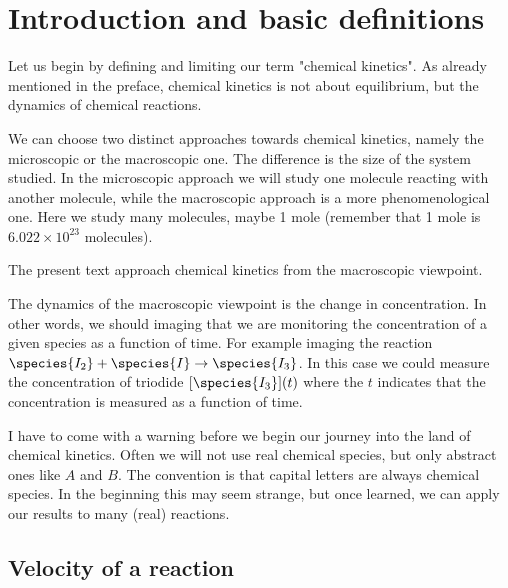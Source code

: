 
\chapter{Introduction and basic definitions}
\label{chap:intro}

Let us begin by defining and limiting our term "chemical kinetics". As already mentioned in the preface, chemical kinetics is not about equilibrium, but the dynamics of chemical reactions.

We can choose two distinct approaches towards chemical kinetics, namely the microscopic or the macroscopic one. The difference is the size of the system studied. In the microscopic approach we will study one molecule reacting with another molecule, while the macroscopic approach is a more phenomenological one. Here we study many molecules, maybe 1 mole (remember that 1 mole is $6.022\times 10^{23}$ molecules).

The present text approach chemical kinetics from the macroscopic viewpoint.

The dynamics of the macroscopic viewpoint is the change in concentration. In other words, we should imaging that we are monitoring the concentration of a given species as a function of time. For example imaging the reaction $\species{I_2} + \species{I} \rightarrow \species{I_3}$. In this case we could measure the concentration of triodide \ie $[\species{I_3}](t)$ where the $t$ indicates that the concentration is measured as a function of time.

I have to come with a warning before we begin our journey into the land of chemical kinetics. Often we will not use real chemical species, but only abstract ones like $A$ and $B$. The convention is that capital letters are always chemical species. In the beginning this may seem strange, but once learned, we can apply our results to many (real) reactions.

\section{Velocity of a reaction}

